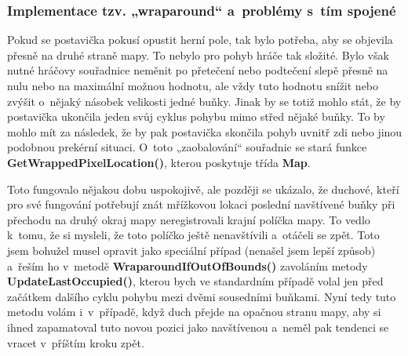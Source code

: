 \documentclass[a4]{article}
\begin{document}
\subsubsection{Implementace tzv. „wraparound“ a~problémy s~tím spojené} \label{wraparound}
Pokud se postavička pokusí opustit herní pole, tak bylo potřeba, aby se objevila přesně na druhé straně mapy. To nebylo pro pohyb hráče tak složité. Bylo však nutné hráčovy souřadnice neměnit po přetečení nebo podtečení slepě přesně na nulu nebo na maximální možnou hodnotu, ale vždy tuto hodnotu snížit nebo zvýšit o~nějaký násobek velikosti jedné buňky. Jinak by se totiž mohlo stát, že by postavička ukončila jeden svůj cyklus pohybu mimo střed nějaké buňky. To by mohlo mít za následek, že by pak postavička skončila pohyb uvnitř zdi nebo jinou podobnou prekérní situaci. O~toto „zaobalování“ souřadnic se stará funkce \textbf{GetWrappedPixelLocation()}, kterou poskytuje třída \textbf{Map}.

Toto fungovalo nějakou dobu uspokojivě, ale později se ukázalo, že duchové, kteří pro své fungování potřebují znát mřížkovou lokaci poslední navštívené buňky při přechodu na druhý okraj mapy neregistrovali krajní políčka mapy. To vedlo k~tomu, že si mysleli, že toto políčko ještě nenavštívili a~otáčeli se zpět. Toto jsem bohužel musel opravit jako speciální případ (nenašel jsem lepší způsob) a~řeším ho v~metodě \textbf{WraparoundIfOutOfBounds()} zavoláním metody \textbf{UpdateLastOccupied()}, kterou bych ve standardním případě volal jen před začátkem dalšího cyklu pohybu mezi dvěmi sousedními buňkami. Nyní tedy tuto metodu volám i~v~případě, když duch přejde na opačnou stranu mapy, aby si ihned zapamatoval tuto novou pozici jako navštívenou a~neměl pak tendenci se vracet v~příštím kroku zpět.
\end{document}
